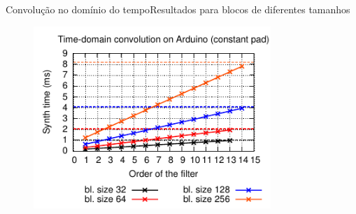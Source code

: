 \begin{frame}{Convolução no domínio do tempo}{Resultados para blocos de diferentes tamanhos}
\begin{figure}
\includegraphics[width=0.8\textwidth]{./img/convolution-comparison-cpad.pdf}
\end{figure}
\end{frame}


